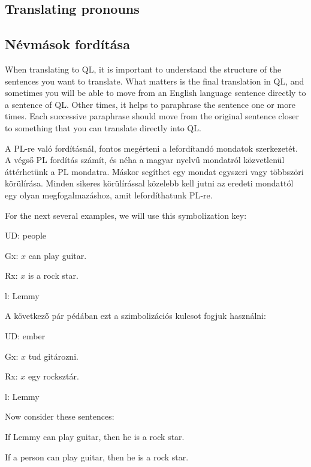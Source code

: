 \subsection*{Translating pronouns}
\subsection{Névmások fordítása}
When translating to QL, it is important to understand the structure of the sentences you want to translate. What matters is the final translation in QL, and sometimes you will be able to move from an English language sentence directly to a sentence of QL. Other times, it helps to paraphrase the sentence one or more times. Each successive paraphrase should move from the original sentence closer to something that you can translate directly into QL.


A PL-re való fordításnál, fontos megérteni a lefordítandó mondatok szerkezetét. A végső PL fordítás számít, és néha a magyar nyelvű mondatról közvetlenül áttérhetünk a PL mondatra. Máskor segíthet egy mondat egyszeri vagy többszöri körülírása. Minden sikeres körülírással közelebb kell jutni az eredeti mondattól egy olyan megfogalmazáshoz, amit lefordíthatunk PL-re.

For the next several examples, we will use this symbolization key:

\begin{ekey}
\item[UD:] people
\item[Gx:] $x$ can play guitar.
\item[Rx:] $x$ is a rock star.
\item[l:] Lemmy
\end{ekey}

A következő pár pédában ezt a szimbolizációs kulcsot fogjuk használni:

\begin{ekey}
\item[UD:] ember
\item[Gx:] $x$ tud gitározni.
\item[Rx:] $x$ egy rocksztár.
\item[l:] Lemmy
\end{ekey}

Now consider these sentences:

\begin{earg}
\item[\ex{pronoun1}] If Lemmy can play guitar, then he is a rock star.
\item[\ex{pronoun2}] If a person can play guitar, then he is a rock star.
\end{earg}

